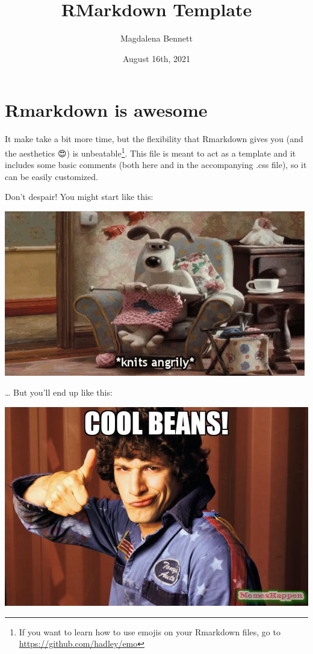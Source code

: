 \documentclass[
]{article}
\title{RMarkdown Template}
\author{Magdalena Bennett}
\date{August 16th, 2021}
\begin{document}
\maketitle

\hypertarget{rmarkdown-is-awesome}{%
\section{Rmarkdown is awesome}\label{rmarkdown-is-awesome}}

It make take a bit more time, but the flexibility that Rmarkdown gives
you (and the aesthetics 😍) is unbeatable\footnote{If you want to learn
  how to use emojis on your Rmarkdown files, go to
  \url{https://github.com/hadley/emo}}. This file is meant to act as a
template and it includes some basic comments (both here and in the
accompanying .css file), so it can be easily customized.

Don't despair! You might start like this:

\includegraphics{./images/knits2.png}

\ldots{} But you'll end up like this:

\includegraphics{./images/cool_beans.jpeg}
\end{document}
